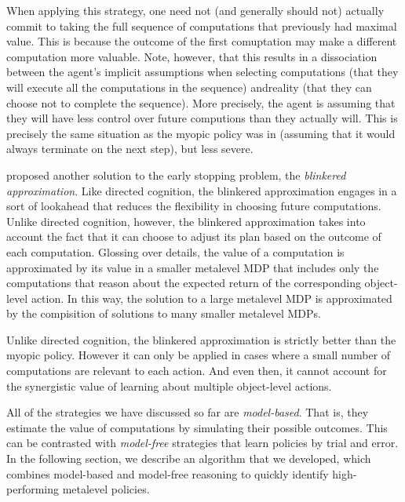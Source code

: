 When applying this strategy, one need not (and generally should not) actually commit to taking the full sequence of computations that previously had maximal value. This is because the outcome of the first comuptation may make a different computation more valuable. Note, however, that this results in a dissociation between the agent's implicit assumptions when selecting computations (that they will execute all the computations in the sequence) andreality (that they can choose not to complete the sequence). More precisely, the agent is assuming that they will have less control over future computions than they actually will. This is precisely the same situation as the myopic policy was in (assuming that it would always terminate on the next step), but less severe.

\citet{hay2012selecting} proposed another solution to the early stopping problem, the \emph{blinkered approximation}. Like directed cognition, the blinkered approximation engages in a sort of lookahead that reduces the flexibility in choosing future computations. Unlike directed cognition, however, the blinkered approximation takes into account the fact that it can choose to adjust its plan based on the outcome of each computation. Glossing over details, the value of a computation is approximated by its value in a smaller metalevel MDP that includes only the computations that reason about the expected return of the corresponding object-level action. In this way, the solution to a large metalevel MDP is approximated by the compisition of solutions to many smaller metalevel MDPs. 

Unlike directed cognition, the blinkered approximation is strictly better than the myopic policy. However it can only be applied in cases where a small number of computations are relevant to each action. And even then, it cannot account for the synergistic value of learning about multiple object-level actions. 

\separator

All of the strategies we have discussed so far are \emph{model-based}. That is, they estimate the value of computations by simulating their possible outcomes. This can be contrasted with \emph{model-free} strategies that learn policies by trial and error. In the following section, we describe an algorithm that we developed, which combines model-based and model-free reasoning to quickly identify high-performing metalevel policies.


